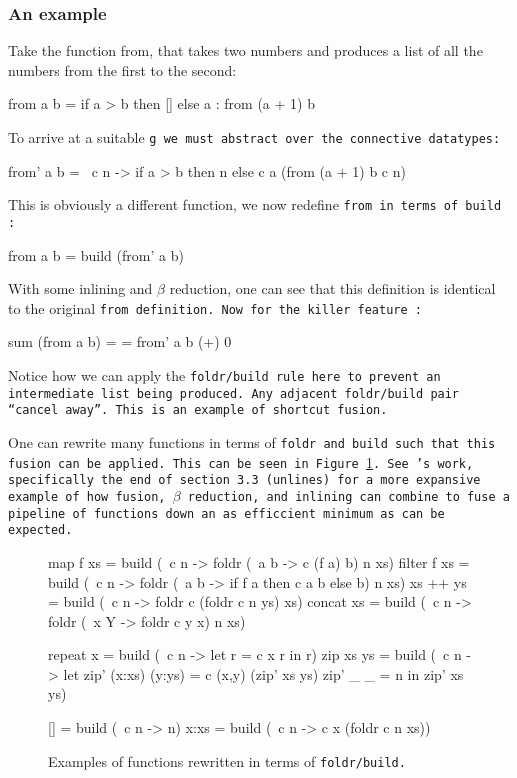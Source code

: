 \subsubsection{An example}
Take the function from, that takes two numbers and produces a list of all the numbers from the first to the second:
\begin{code}
    from a b = if a > b
               then []
               else a : from (a + 1) b
\end{code}
To arrive at a suitable \tt{g} we must abstract over the connective datatypes:
\begin{code}
    from' a b = \ c n  -> if a > b
                        then n
                        else c a (from (a + 1) b c n)
\end{code}
This is obviously a different function, we now redefine \tt{from} in terms of \tt{build} \citep{Gill1993}:
\begin{code}
    from a b = build (from' a b)
\end{code}
With some inlining and $\beta$ reduction, one can see that this definition is identical to the original \tt{from} definition. Now for the killer feature \citep{Gill1993}:
\begin{code}[escapechar=\%]
    sum (from a b)
      = %
      = from' a b (+) 0
\end{code}
Notice how we can apply the \tt{foldr/build} rule here to prevent an intermediate list being produced. Any adjacent \tt{foldr/build} pair ``cancel away''.
This is an example of shortcut fusion.

One can rewrite many functions in terms of \tt{foldr} and \tt{build} such that this fusion can be applied. This can be seen in Figure \ref{fig:foldr/build_ex}.
See \cite{Gill1993}'s work, specifically the end of section 3.3 (\tt{unlines}) for a more expansive example of how fusion, $\beta$ reduction, and inlining can combine to fuse a pipeline of functions down an as efficcient minimum as can be expected.
\begin{figure}[h]
    \centering
    \begin{code}
    map f xs    = build (\ c n -> foldr (\ a b -> c (f a) b) n xs)
    filter f xs = build (\ c n -> foldr (\ a b -> if f a then c a b else b) n xs)
    xs ++ ys    = build (\ c n -> foldr c (foldr c n ys) xs)
    concat xs   = build (\ c n -> foldr (\ x Y -> foldr c y x) n xs)
    
    repeat x    = build (\ c n -> let r = c x r in r)
    zip xs ys   = build (\ c n -> let zip' (x:xs) (y:ys) = c (x,y) (zip' xs ys)
                                      zip' _      _      = n
                                      in zip' xs ys)

    []         = build (\ c n -> n)
    x:xs       = build (\ c n -> c x (foldr c n xs))
    \end{code}
    \caption{Examples of functions rewritten in terms of \tt{foldr/build}. \citep{Gill1993}}
    \label{fig:foldr/build_ex}
\end{figure}





